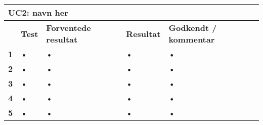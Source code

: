 
\begin{longtable}{|p{5mm}|p{40mm}|p{40mm}|p{20mm}|p{25mm}|}
\hline 
\multicolumn{5}{|l|}{\textbf{UC2: navn her}} \\ 
\hline 
& \textbf{Test} & \textbf{Forventede resultat} & \textbf{Resultat} & \textbf{Godkendt / kommentar} \\ 
\hline 
\textbf{1}& • & • & • & • \\ 
\hline 
\textbf{2}& • & • & • & • \\ 
\hline 
\textbf{3}& • & • & • & • \\ 
\hline 
\textbf{4}& • & • & • & • \\ 
\hline 
\textbf{5}& • & • & • & • \\ 
\hline 
\end{longtable}
